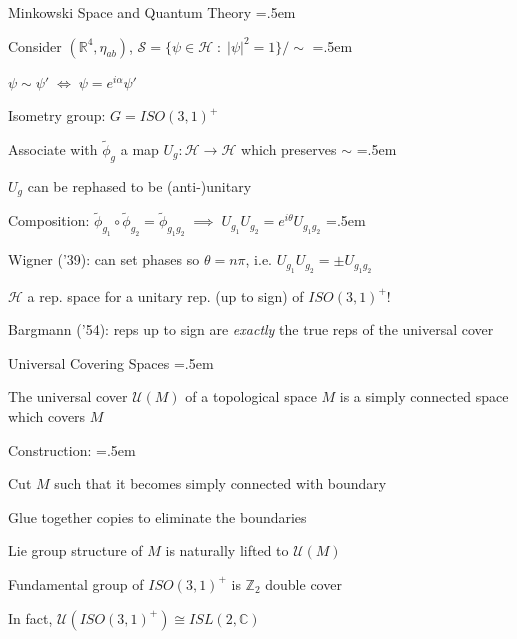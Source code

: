 \documentclass[xcolor={dvipsnames}]{beamer}
\newcommand{\magsq}[1]{\big|#1\big|^2}
\let\olditemize=\itemize
\let\endolditemize=\enditemize
\renewenvironment{itemize}{\olditemize \itemsep=.5em }{\endolditemize}
\begin{document}
\begin{frame}{Minkowski Space and Quantum Theory}
    \begin{itemize}
        \item<2-> Consider $(\mathbb{R}^4, \eta_{ab})$, $\mathcal{S} = \{\psi \in \mathcal{H}\;:\; \magsq{\psi} = 1\}/\sim$
        \begin{itemize}
            \item<3-> $\psi \sim \psi' \;\iff\; \psi = e^{i\alpha}\psi' $
        \end{itemize}  
        \item<4-> Isometry group: $G = ISO(3, 1)^+$
        \item<5-> Associate with $\tilde{\phi}_g$ a map $U_g: \mathcal{H}\rightarrow\mathcal{H}$ which preserves $\sim$
        \begin{itemize}
            \item<6-> $U_g$ can be rephased to be (anti-)unitary
        \end{itemize}
        \item<7-> Composition: $\tilde{\phi}_{g_1}\circ\tilde{\phi}_{g_2} = \tilde{\phi}_{g_1g_2} \;\implies\; U_{g_1}U_{g_2} = e^{i\theta}U_{g_1g_2}$
        \begin{itemize}
            \item<8-> Wigner ('39): can set phases so $\theta = n\pi$, i.e. $U_{g_1}U_{g_2} = \pm U_{g_1g_2}$
        \end{itemize}
        \item<9-> $\mathcal{H}$ a rep. space for a unitary rep. (up to sign) of $ISO(3, 1)^+$!
        \item<10-> Bargmann ('54): reps up to sign are \textit{exactly} the true reps of the universal cover
    \end{itemize}
\end{frame}

\begin{frame}{Universal Covering Spaces}
    \begin{itemize}
        \item<2-> The universal cover $\mathcal{U}(M)$ of a topological space $M$ is a simply connected space which covers $M$
        \item<3-> Construction:
        \begin{itemize}
            \item<4-> Cut $M$ such that it becomes simply connected with boundary
            \item<5-> Glue together copies to eliminate the boundaries
        \end{itemize}
        \item<6-> Lie group structure of $M$ is naturally lifted to $\mathcal{U}(M)$
        \item<7-> Fundamental group of $ISO(3, 1)^+$ is $\mathbb{Z}_2$ \textrightarrow\; double cover
        \item<8-> In fact, $\mathcal{U}(ISO(3, 1)^+) \cong ISL(2, \mathbb{C})$
    \end{itemize}
\end{frame}
\end{document}
